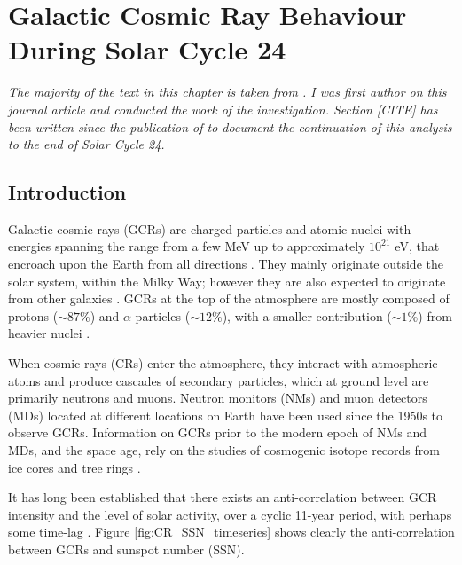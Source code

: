 \chapter{Galactic Cosmic Ray Behaviour During Solar Cycle 24}\label{chap:GCR_SSN_24}


\textit{The majority of the text in this chapter is taken from \cite{ross_behaviour_2019}. I was first author on this journal article and conducted the work of the investigation. Section [CITE] has been written since the publication of \cite{ross_behaviour_2019} to document the continuation of this analysis to the end of Solar Cycle 24.}


\section{Introduction}
\label{S-Introduction} 

Galactic cosmic rays (GCRs) are charged particles and atomic nuclei with energies spanning the range from a few MeV up to approximately $10^{21}$ eV, that encroach upon the Earth from all directions  \citep{giacalone_energetic_2010}. They mainly originate outside the solar system, within the Milky Way; however they are also expected to originate from other galaxies \citep{aab_observation_2017}. GCRs at the top of the atmosphere are mostly composed of protons ($\sim87$\%) and $\alpha$-particles ($\sim12$\%), with a smaller contribution ($\sim1$\%) from heavier nuclei \citep{dunai_cosmic_2010}.

When cosmic rays (CRs) enter the atmosphere, they interact with atmospheric atoms and produce cascades of secondary particles, which at ground level are primarily neutrons and muons. Neutron monitors (NMs) and muon detectors (MDs) located at different locations on Earth have been used since the 1950s to observe GCRs. Information on GCRs prior to the modern epoch of NMs and MDs, and the space age, rely on the studies of cosmogenic isotope records from ice cores and tree rings \citep{owens_heliospheric_2013}.

It has long been established that there exists an anti-correlation between GCR intensity and the level of solar activity, over a cyclic 11-year period, with perhaps some time-lag  \citep{forbush_cosmic-ray_1958, parker_passage_1965, usoskin_correlative_1998, van_allen_modulation_2000}. Figure \ref{fig:CR_SSN_timeseries} shows clearly the anti-correlation between GCRs and sunspot number (SSN).


